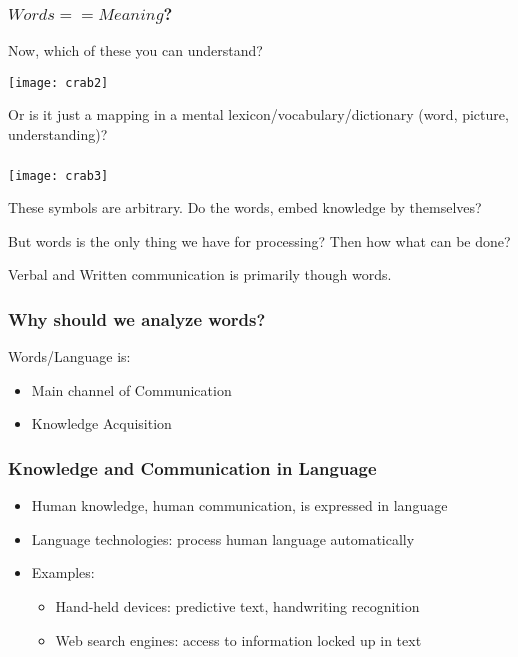 \begin{frame}[fragile] \frametitle{$Words == Meaning$?}
Now, which of these you can understand?

\begin{center}
\texttt{[image: crab2]}
\end{center}
Or is it just a mapping in a mental lexicon/vocabulary/dictionary (word, picture, understanding)?
\end{frame}


\begin{frame}[fragile]\frametitle{}
\begin{center}
\texttt{[image: crab3]}
\end{center}
These symbols are arbitrary. Do the words, embed knowledge by themselves?

But words is the only thing we have for processing? Then how what can be done?

Verbal and Written communication is primarily though words.
\end{frame}

\begin{frame}[fragile] \frametitle{Why should we analyze words?}
Words/Language is:

  \begin{itemize}
    \item Main channel of  Communication
    \item Knowledge Acquisition
  \end{itemize}

\end{frame}


\begin{frame}[fragile] \frametitle{Knowledge and Communication in Language}
  \begin{itemize}
    \item Human knowledge, human communication, is expressed in language
    \item Language technologies: process human language automatically
	\item Examples:
\begin{itemize}
    \item Hand-held devices: predictive text, handwriting recognition
    \item Web search engines: access to information locked up in text
\end{itemize}
  \end{itemize}
\end{frame}

